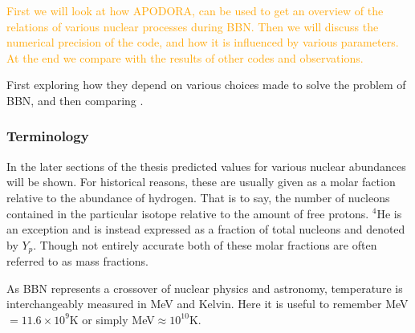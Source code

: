 \textcolor{orange}{First we will look at how APODORA, can be used to get an overview of the relations of various nuclear processes during BBN. Then we will discuss the numerical precision of the code, and how it is influenced by various parameters. At the end we compare with the results of other codes and observations.}

First exploring how they depend on various choices made to solve the problem of BBN, and then comparing .



\subsubsection{Terminology}

In the later sections of the thesis predicted values for various nuclear abundances will be shown. For historical reasons, these are usually given as a molar faction relative to the abundance of hydrogen. That is to say, the number of nucleons contained in the particular isotope relative to the amount of free protons. ${}^4$He is an exception and is instead expressed as a fraction of total nucleons and denoted by $Y_p$. Though not entirely accurate both of these molar fractions are often referred to as mass fractions. 

As BBN represents a crossover of nuclear physics and astronomy, temperature is interchangeably measured in MeV and Kelvin. Here it is useful to remember MeV$=11.6\times10^9 $K or simply MeV$\approx 10^{10}$K.


